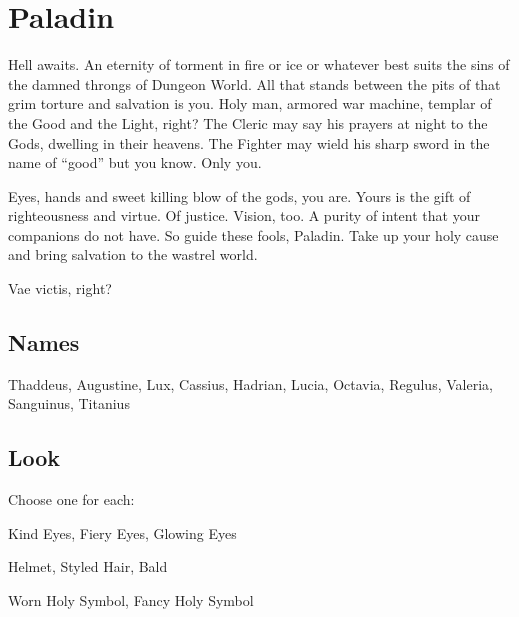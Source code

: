 \chapter{Paladin}
  
            

         

Hell awaits. An eternity of torment in fire or ice or whatever best suits the sins of the damned throngs of Dungeon World. All that stands between the pits of that grim torture and salvation is you. Holy man, armored war machine, templar of the Good and the Light, right? The Cleric may say his prayers at night to the Gods, dwelling in their heavens. The Fighter may wield his sharp sword in the name of “good” but you know. Only you.

         

Eyes, hands and sweet killing blow of the gods, you are. Yours is the gift of righteousness and virtue. Of justice. Vision, too. A purity of intent that your companions do not have. So guide these fools, Paladin. Take up your holy cause and bring salvation to the wastrel world.

         

Vae victis, right?

       

       
\section{Names}   
       

         

Thaddeus, Augustine, Lux, Cassius, Hadrian, Lucia, Octavia, Regulus, Valeria, Sanguinus, Titanius

       

       
\section{Look}  
       

         

Choose one for each:

         

Kind Eyes, Fiery Eyes, Glowing Eyes

         

Helmet, Styled Hair, Bald

         

Worn Holy Symbol, Fancy Holy Symbol

         

